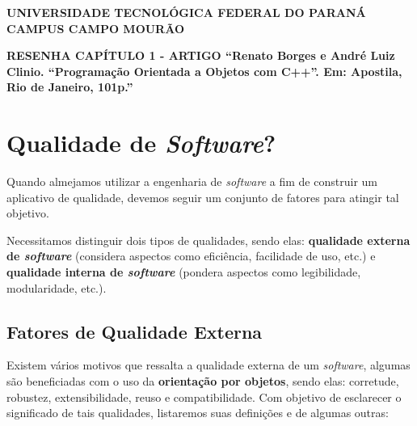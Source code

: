 \documentclass[a4paper, 12pt]{article}
\begin{document}
	
	\hspace{5cm}
	
	\begin{large}
		\begin{center}
			\textbf{UNIVERSIDADE TECNOLÓGICA FEDERAL DO PARANÁ}\newline
			\textbf{CAMPUS CAMPO MOURÃO}
		\end{center}
	\end{large}
	
	\hspace{20cm}
	
	\begin{center}
		\textbf{RESENHA CAPÍTULO 1 - ARTIGO ``Renato Borges e André Luiz Clinio. ``Programação Orientada a Objetos com C++''. Em: Apostila, Rio de Janeiro, 101p.''}
	\end{center}

	\hspace{10cm}
	
	\section{Qualidade de \textit{Software}?}
	
	\onehalfspacing
	Quando almejamos utilizar a engenharia de \textit{software} a fim de construir um aplicativo de qualidade, devemos seguir um conjunto de fatores para atingir tal objetivo.
	
	Necessitamos distinguir dois tipos de qualidades, sendo elas: \textbf{qualidade externa de \textit{software}} (considera aspectos como eficiência, facilidade de uso, etc.) e \textbf{qualidade interna de \textit{software}} (pondera aspectos como legibilidade, modularidade, etc.).
	
	\subsection{Fatores de Qualidade Externa}
	
	Existem vários motivos que ressalta a qualidade externa de um \textit{software}, algumas são beneficiadas com o uso da \textbf{orientação por objetos}, sendo elas: corretude, robustez, extensibilidade, reuso e compatibilidade. Com objetivo de esclarecer o significado de tais qualidades, listaremos suas definições e de algumas outras:
	
\end{document}
